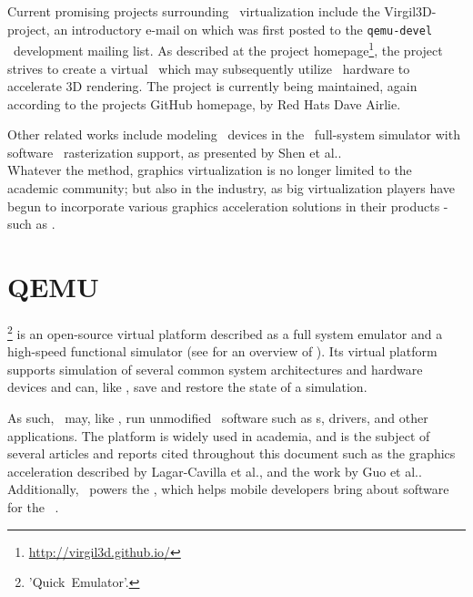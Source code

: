 Current promising projects surrounding \dvttermgpu\ virtualization include the Virgil3D-project, an introductory e-mail on which was first posted to the \texttt{qemu-devel} \dvttermqemu\ development mailing list.
As described at the project homepage\footnote{\url{http://virgil3d.github.io/}}, the project strives to create a virtual \dvttermgpu\ which may subsequently utilize \dvttermhost\ hardware to accelerate 3D rendering.
The project is currently being maintained, again according to the projects GitHub homepage, by Red Hats Dave Airlie.

Other related works include modeling \dvttermgpu\ devices in the \dvttermqemu\ full-system simulator with software \dvttermopengles\ rasterization support, as presented by Shen et al..\\

\noindent
Whatever the method, graphics virtualization is no longer limited to the academic community; but also in the industry, as big virtualization players have begun to incorporate various graphics acceleration solutions in their products - such as \dvttermvmware {}.

\section{QEMU}
\label{sec:relatedwork_qemu}
\dvttermqemu \footnote{'Quick~Emulator'.} is an open-source virtual platform described as a full system emulator and a high-speed functional simulator (see  for an overview of \dvttermqemu ).
Its virtual platform supports simulation of several common system architectures and hardware devices and can, like \dvttermsimics , save and restore the state of a simulation.

As such, \dvttermqemu\ may, like \dvttermsimics , run unmodified \dvttermtarget\ software such as \dvttermos s, drivers, and other applications.
The platform is widely used in academia, and is the subject of several articles and reports cited throughout this document such as the graphics acceleration described by Lagar-Cavilla et al., and the work by Guo et al..
Additionally, \dvttermqemu\ powers the \dvttermandroidemulator , which helps mobile developers bring about software for the \dvttermandroid\ \dvttermos .

